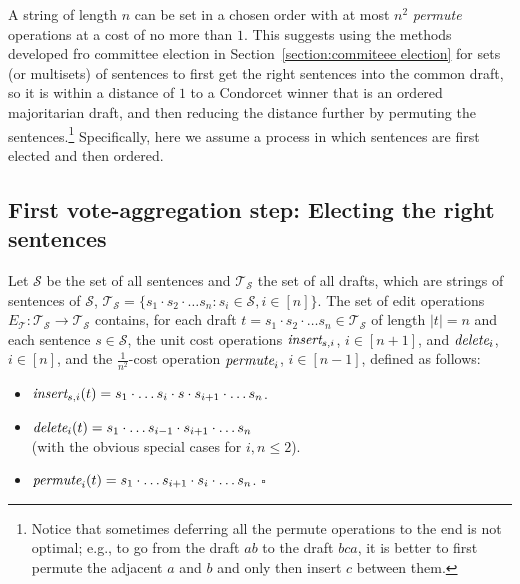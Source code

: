 \documentclass[sigconf]{aamas}  %
\newcommand{\qqed}{\hfill$\square$}
\newcommand{\calS}{\mathcal{S}}
\newcommand{\calT}{\mathcal{T}}
\newcommand{\iinsert}[1]{\emph{insert}_{#1}}
\newcommand{\ddelete}[1]{\emph{delete}_{#1}}
\newcommand{\permute}[1]{\emph{permute}_{#1}}
\begin{document}
A string of length $n$ can be set in a chosen order with at most ${n^2}$ \emph{permute} operations at a cost of no more than $1$. This suggests using the methods developed fro committee election in Section~\ref{section:commiteee election} for sets (or multisets) of sentences to first get the right sentences into the common draft, so it is within a distance of $1$ to a Condorcet winner that is an ordered majoritarian draft, and then reducing the distance further by permuting the sentences.\footnote{
Notice that sometimes deferring all the permute operations to the end is not optimal; e.g., to go from the draft $ab$ to the draft $bca$, it is better to first permute the adjacent $a$ and $b$ and only then insert $c$ between them.} Specifically, here we assume a process in which sentences are first elected and then ordered.

\subsection{First vote-aggregation step: Electing the right sentences}

\begin{definition}
Let $\calS$ be the set of all sentences and $\calT_\calS$ the set of all drafts, which are strings of sentences of $\calS$,   
$\calT_\calS = \{s_1\cdot s_2 \cdot \ldots  s_n : s_i \in \calS, i \in [n]\}$. The set of edit operations $E_\calT: \calT_\calS \rightarrow \calT_\calS$ contains, for each draft $t = s_1\cdot s_2\cdot \ldots s_n \in \calT_\calS$ of length $|t|=n$ and each sentence $s \in \calS$, the unit cost operations $\iinsert{{s, i}}$, $i \in [n + 1]$, and $\ddelete{i}$, $i \in [n]$, and the $\frac{1}{n^2}$-cost operation $\permute{i}$, $i \in [n - 1]$, defined as follows:
%
\begin{itemize}

\item
$\iinsert{{s, i}}(t) = s_1\cdot \ldots s_i\cdot s\cdot s_{i + 1}\cdot \ldots s_n$.


\item
$\ddelete{i}(t) = s_1\cdot \ldots s_{i - 1}\cdot s_{i + 1}\cdot \ldots s_n$ \\
(with the obvious special cases for $i, n \le  2$).

\item
$\permute{i}(t) = s_1\cdot \ldots s_{i+1}\cdot s_i\cdot \ldots s_n$.
\qqed
\end{itemize}
%
\end{definition}
\end{document}
